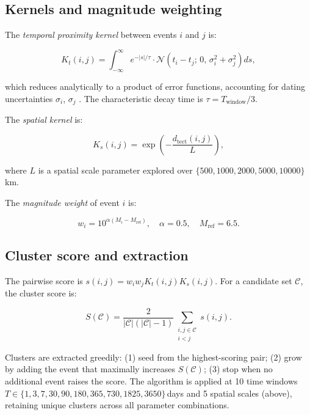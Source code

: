 \documentclass[draft]{agujournal2019}
\begin{document}
\subsection{Kernels and magnitude weighting}

The \textit{temporal proximity kernel} between events $i$ and $j$ is:

\begin{equation}
  K_t(i,j) = \int_{-\infty}^{\infty}
    e^{-|s|/\tau} \cdot
    \mathcal{N}\!\left(t_i - t_j;\, 0,\, \sigma_i^2 + \sigma_j^2\right) ds,
  \label{eq:Kt}
\end{equation}

which reduces analytically to a product of error functions, accounting for
dating uncertainties $\sigma_i$, $\sigma_j$ \citep{Press1992}.  The
characteristic decay time is $\tau = T_\mathrm{window}/3$.

The \textit{spatial kernel} is:

\begin{equation}
  K_s(i,j) = \exp\!\left(-\frac{d_\mathrm{tect}(i,j)}{L}\right),
  \label{eq:Ks}
\end{equation}

where $L$ is a spatial scale parameter explored over
$\{500, 1000, 2000, 5000, 10000\}$\,km.

The \textit{magnitude weight} of event $i$ is:

\begin{equation}
  w_i = 10^{\alpha(M_i - M_\mathrm{ref})},\quad
  \alpha = 0.5,\quad M_\mathrm{ref} = 6.5.
  \label{eq:weight}
\end{equation}

\subsection{Cluster score and extraction}

The pairwise score is $s(i,j) = w_i w_j K_t(i,j) K_s(i,j)$.
For a candidate set $\mathcal{C}$, the cluster score is:

\begin{equation}
  S(\mathcal{C}) = \frac{2}{|\mathcal{C}|(|\mathcal{C}|-1)}
  \sum_{\substack{i,j\in\mathcal{C} \\ i<j}} s(i,j).
  \label{eq:score}
\end{equation}

Clusters are extracted greedily: (1) seed from the highest-scoring pair;
(2) grow by adding the event that maximally increases $S(\mathcal{C})$;
(3) stop when no additional event raises the score.  The algorithm is applied
at 10 time windows $T \in \{1, 3, 7, 30, 90, 180, 365, 730, 1825, 3650\}$\,days
and 5 spatial scales (above), retaining unique clusters across all
parameter combinations.
\end{document}
